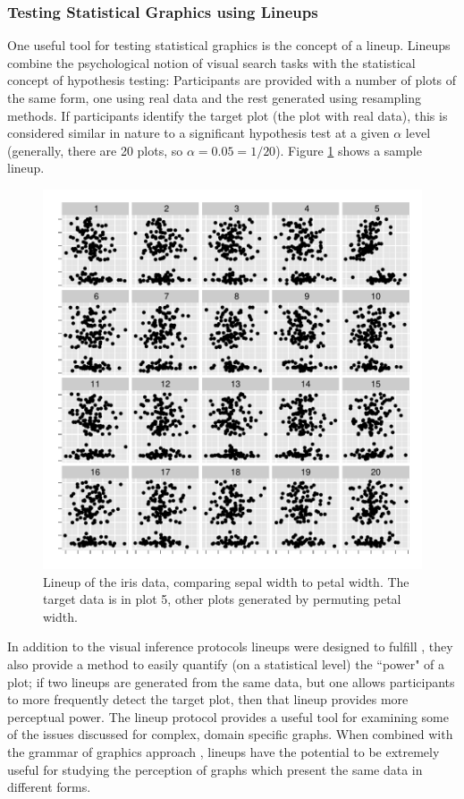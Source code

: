 \documentclass[11pt]{isuthesis}\usepackage[]{graphicx}\usepackage[]{color}
\begin{document}
\subsubsection{Testing Statistical Graphics using Lineups}
One useful tool for testing statistical graphics is the concept of a lineup. Lineups combine the psychological notion of visual search tasks with the statistical concept of hypothesis testing: Participants are provided with a number of plots of the same form, one using real data and the rest generated using resampling methods. If participants identify the target plot (the plot with real data), this is considered similar in nature to a significant hypothesis test at a given $\alpha$ level (generally, there are 20 plots, so $\alpha=0.05 = 1/20$). Figure \ref{fig:lineupexample} shows a sample lineup. 




\begin{figure}[htbp]\centering
\includegraphics[width=.75\textwidth]{fig-irislineup}
\caption[Lineup for testing statistical graphics]{Lineup of the iris data, comparing sepal width to petal width. The target data is in plot 5, other plots generated by permuting petal width.}\label{fig:lineupexample}
\end{figure}
In addition to the visual inference protocols lineups were designed to fulfill \citep{buja2009statistical}, they also provide a method to easily quantify (on a statistical level) the ``power" of a plot; if two lineups are generated from the same data, but one allows participants to more frequently detect the target plot, then that lineup provides more perceptual power. The lineup protocol provides a useful tool for examining some of the issues discussed for complex, domain specific graphs. When combined with the grammar of graphics approach \citep{wickham2010graphical}, lineups have the potential to be extremely useful for studying the perception of graphs which present the same data in different forms.
\end{document}
